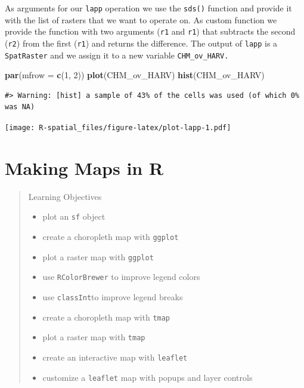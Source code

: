 \documentclass[
]{book}
\newenvironment{Shaded}{\begin{snugshade}}{\end{snugshade}}
\newcommand{\AttributeTok}[1]{\textcolor[rgb]{0.13,0.29,0.53}{#1}}
\newcommand{\DecValTok}[1]{\textcolor[rgb]{0.00,0.00,0.81}{#1}}
\newcommand{\FunctionTok}[1]{\textcolor[rgb]{0.13,0.29,0.53}{\textbf{#1}}}
\newcommand{\NormalTok}[1]{#1}
\providecommand{\tightlist}{%
  \setlength{\itemsep}{0pt}\setlength{\parskip}{0pt}}
\begin{document}
As arguments for our \texttt{lapp} operation we use the \texttt{sds()} function and provide it with the list of rasters that we want to operate on. As custom function we provide the function with two arguments (\texttt{r1} and \texttt{r1}) that subtracts the second (\texttt{r2}) from the first (\texttt{r1}) and returns the difference. The output of \texttt{lapp} is a \texttt{SpatRaster} and we assign it to a new variable \texttt{CHM\_ov\_HARV.}

\begin{Shaded}
\begin{Highlighting}[]
\FunctionTok{par}\NormalTok{(}\AttributeTok{mfrow =} \FunctionTok{c}\NormalTok{(}\DecValTok{1}\NormalTok{, }\DecValTok{2}\NormalTok{))}
\FunctionTok{plot}\NormalTok{(CHM\_ov\_HARV)}
\FunctionTok{hist}\NormalTok{(CHM\_ov\_HARV)}
\end{Highlighting}
\end{Shaded}

\begin{verbatim}
#> Warning: [hist] a sample of 43% of the cells was used (of which 0% was NA)
\end{verbatim}

\texttt{[image: R-spatial\_files/figure-latex/plot-lapp-1.pdf]}

\hypertarget{mapping}{%
\chapter{Making Maps in R}\label{mapping}}

\begin{quote}
Learning Objectives

\begin{itemize}
\tightlist
\item
  plot an \texttt{sf} object
\item
  create a choropleth map with \texttt{ggplot}
\item
  plot a raster map with \texttt{ggplot}
\item
  use \texttt{RColorBrewer} to improve legend colors
\item
  use \texttt{classInt}to improve legend breaks
\item
  create a choropleth map with \texttt{tmap}
\item
  plot a raster map with \texttt{tmap}
\item
  create an interactive map with \texttt{leaflet}
\item
  customize a \texttt{leaflet} map with popups and layer controls
\end{itemize}
\end{quote}
\end{document}

